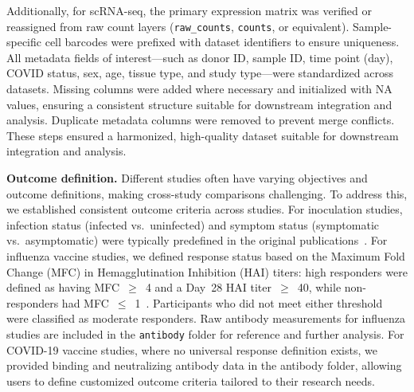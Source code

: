 \documentclass[
  12pt]{article}
\begin{document}
Additionally, for scRNA-seq, the primary expression matrix was verified or reassigned from raw count layers (\texttt{raw\_counts}, \texttt{counts}, or equivalent). Sample-specific cell barcodes were prefixed with dataset identifiers to ensure uniqueness. All metadata fields of interest—such as donor ID, sample ID, time point (day), COVID status, sex, age, tissue type, and study type—were standardized across datasets. Missing columns were added where necessary and initialized with NA values, ensuring a consistent structure suitable for downstream integration and analysis. Duplicate metadata columns were removed to prevent merge conflicts. These steps ensured a harmonized, high-quality dataset suitable for downstream integration and analysis.

\noindent\textbf{Outcome definition.}
Different studies often have varying objectives and outcome definitions, making cross-study comparisons challenging. To address this, we established consistent outcome criteria across studies. For inoculation studies, infection status (infected vs.\ uninfected) and symptom status (symptomatic vs.\ asymptomatic) were typically predefined in the original publications~\citep{liu2016individualized,habibi2020neutrophilic,proud2008gene,davenport2015transcriptomic,muller2017development}. For influenza vaccine studies, we defined response status based on the Maximum Fold Change (MFC) in Hemagglutination Inhibition (HAI) titers: high responders were defined as having MFC~$\geq$~4 and a Day~28 HAI titer~$\geq$~40, while non-responders had MFC~$\leq$~1~\citep{hipc2017multicohort}. Participants who did not meet either threshold were classified as moderate responders. Raw antibody measurements for influenza studies are included in the \texttt{antibody} folder for reference and further analysis. For COVID-19 vaccine studies, where no universal response definition exists, we provided binding and neutralizing antibody data in the antibody folder, allowing users to define customized outcome criteria tailored to their research needs.
\end{document}
